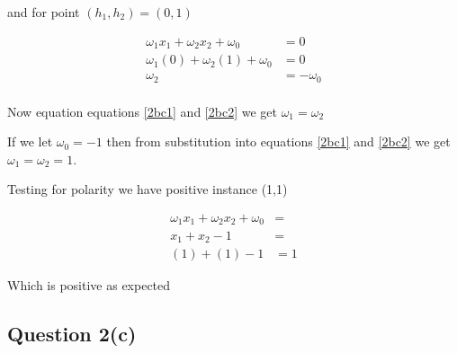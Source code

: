 \documentclass[10pt,a4paper]{article}
\begin{document}
and for point $(h_1,h_2) = (0,1)$

\begin{equation}
\label{2bc2}
\begin{split}
\omega_1 x_1 + \omega_2 x_2 + \omega_0 &= 0 \\
\omega_1(0) + \omega_2(1) + \omega_0 &= 0 \\
\omega_2 &= -\omega_0\\
\end{split}
\end{equation}

Now equation equations \ref{2bc1} and \ref{2bc2} we get $\omega_1 = \omega_2$

If we let $\omega_0 = -1$ then from substitution into equations \ref{2bc1} and \ref{2bc2} we get$\omega_1=\omega_2=1$.

Testing for polarity we have positive instance (1,1) 

\begin{equation}
\begin{split}
\omega_1 x_1 + \omega_2 x_2 + \omega_0 &= \\
x_1 + x_2 -1 &= \\
(1) + (1) - 1 &= 1
\end{split}
\end{equation}

Which is positive as expected













\subsection{Question 2(c)}
\end{document}
